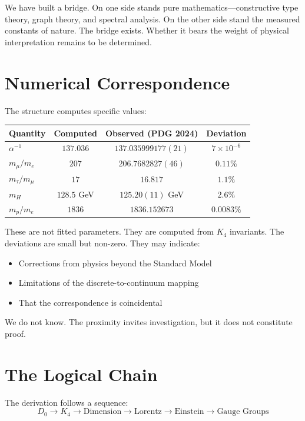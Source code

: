 \documentclass[11pt,a4paper]{book}
\begin{document}
We have built a bridge. On one side stands pure mathematics---constructive type theory, graph theory, and spectral analysis. On the other side stand the measured constants of nature. The bridge exists. Whether it bears the weight of physical interpretation remains to be determined.

\section{Numerical Correspondence}

The structure computes specific values:

\begin{center}
\begin{tabular}{lccc}
\hline
\textbf{Quantity} & \textbf{Computed} & \textbf{Observed (PDG 2024)} & \textbf{Deviation} \\
\hline
$\alpha^{-1}$ & $137.036$ & $137.035999177(21)$ & $7 \times 10^{-6}$ \\
$m_\mu / m_e$ & $207$ & $206.7682827(46)$ & $0.11\%$ \\
$m_\tau / m_\mu$ & $17$ & $16.817$ & $1.1\%$ \\
$m_H$ & $128.5$ GeV & $125.20(11)$ GeV & $2.6\%$ \\
$m_p / m_e$ & $1836$ & $1836.152673$ & $0.0083\%$ \\
\hline
\end{tabular}
\end{center}

These are not fitted parameters. They are computed from $K_4$ invariants. The deviations are small but non-zero. They may indicate:
\begin{itemize}
\item Corrections from physics beyond the Standard Model
\item Limitations of the discrete-to-continuum mapping
\item That the correspondence is coincidental
\end{itemize}

We do not know. The proximity invites investigation, but it does not constitute proof.

\section{The Logical Chain}

The derivation follows a sequence:
\[
D_0 \to K_4 \to \text{Dimension} \to \text{Lorentz} \to \text{Einstein} \to \text{Gauge Groups}
\]
\end{document}
